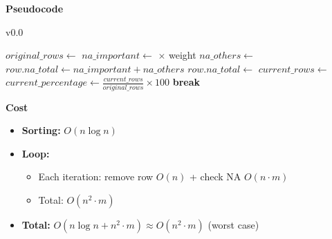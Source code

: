 \documentclass[a4paper,12pt]{article}
\begin{document}
\textbf{Pseudocode}
\begin{algorithm}[H]
\caption{v0.0}
\begin{algorithmic}[1]
    \State $original\_rows \gets$ 
            \State $na\_important \gets$  $\times$ weight
            \State $na\_others \gets$ 
            \State $row.na\_total \gets na\_important + na\_others$
        \Else
            \State $row.na\_total \gets$ 
        \EndIf
    \EndFor
    \State {}
        \State $current\_rows \gets$ 
        \State $current\_percentage \gets \frac{current\_rows}{original\_rows} \times 100$
            \State \textbf{break}
        \EndIf
        \State {}
    \EndWhile
    \State {}
\EndFunction
\end{algorithmic}
\end{algorithm}

\textbf{Cost}
\begin{itemize}
    \item \textbf{Sorting:} $O(n \log n)$
    \item \textbf{Loop:} 
        \begin{itemize}
            \item Each iteration: remove row $O(n)$ + check NA $O(n \cdot m)$
            \item Total: $O(n^2 \cdot m)$
        \end{itemize}
    \item \textbf{Total:} $O(n \log n + n^2 \cdot m) \approx O(n^2 \cdot m)$ (worst case)
\end{itemize}
\end{document}
